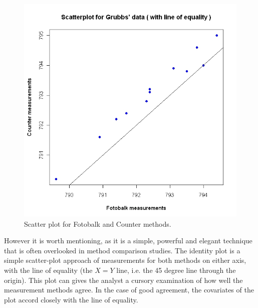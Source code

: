 \documentclass[12pt, a4paper]{report}
\theoremstyle{plain}
\theoremstyle{definition}
\theoremstyle{remark}
\begin{document}
	\begin{figure}[h!]
		\begin{center}
			\includegraphics[width=125mm]{images/GrubbsScatter.jpeg}
			\caption{Scatter plot for Fotobalk and Counter methods.}\label{GrubbsScatter}
		\end{center}
	\end{figure}
	However it is worth mentioning, as it is a simple, powerful and elegant technique that is often overlooked in method comparison studies. The identity plot is a simple scatter-plot approach of measurements for both methods on either axis, with the line of equality (the $X=Y$ line, i.e. the 45 degree line through the origin). This plot can gives the analyst a cursory examination of how well the measurement methods agree. In the case of good agreement, the covariates of the plot accord closely with the line of equality.
\end{document}
